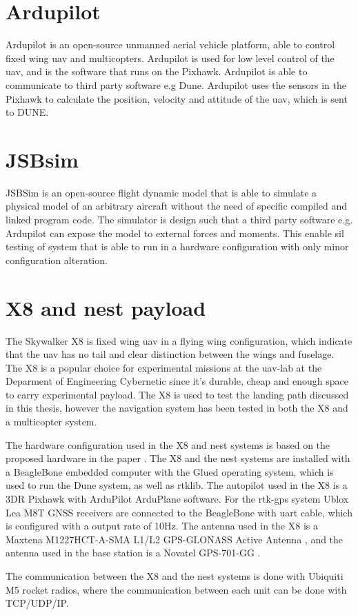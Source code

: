 \section{Ardupilot}\label{ss:ardupilot}
Ardupilot is an open-source unmanned aerial vehicle platform, able to control fixed wing \gls{uav} and multicopters. Ardupilot is used for low level control of the \gls{uav}, and is the software that runs on the Pixhawk. Ardupilot is able to communicate to third party software e.g Dune. Ardupilot uses the sensors in the Pixhawk to calculate the position, velocity and attitude of the \gls{uav}, which is sent to DUNE.
\section{JSBsim}
JSBSim \citep{berndt2004jsbsim} is an open-source flight dynamic model that is able to simulate a physical model of an arbitrary aircraft without the need of specific compiled and linked program code. The simulator is design such that a third party software e.g. Ardupilot can expose the model to external forces and moments. This enable \gls{sil} testing of system that is able to run in a hardware configuration with only minor configuration alteration.
\section{X8 and nest payload}
The Skywalker X8 is fixed wing \gls{uav} in a flying wing configuration, which indicate that the \gls{uav} has no tail and clear distinction between the wings and fuselage. The X8 is a popular choice for experimental missions at the \gls{uav}-lab at the Deparment of Engineering Cybernetic since it's durable, cheap and enough space to carry experimental payload. The X8 is used to test the landing path discussed in this thesis, however the navigation system has been tested in both the X8 and a multicopter system.

The hardware configuration used in the X8 and nest systems is based on the proposed hardware in the paper \citep{zolich2015unmanned}. The X8 and the nest systems are installed with a BeagleBone embedded computer with the Glued operating system, which is used to run the Dune system, as well as rtklib. The autopilot used in the X8 is a 3DR Pixhawk with ArduPilot ArduPlane software. For the \gls{rtk-gps} system Ublox Lea M8T GNSS receivers \citep{UbloxDataSheet,UbloxReceiverDescription} are connected to the BeagleBone with uart cable, which is configured with a output rate of 10Hz. The antenna used in the X8 is a Maxtena M1227HCT-A-SMA L1/L2 GPS-GLONASS Active Antenna \citep{maxtena}, and the antenna used in the base station is a Novatel GPS-701-GG \citep{novatel}.

The communication between the X8 and the nest systems is done with Ubiquiti M5 rocket \citep{rocketM5} radios, where the communication between each unit can be done with TCP/UDP/IP.
\cleardoublepage